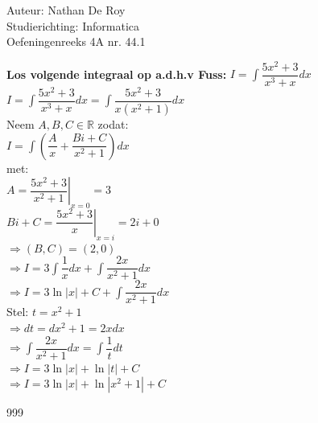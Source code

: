 \documentclass[a4paper]{article}
\begin{document}
\noindent \large Auteur: Nathan De Roy \\
\noindent \large Studierichting: Informatica\\
\noindent \large Oefeningenreeks 4A nr. 44.1\\

\medskip
\normalsize


\textbf{Los volgende integraal op a.d.h.v Fuss:} $I = \displaystyle\int \dfrac{5x^2 + 3}{x^3 + x}dx$\\

$I = \displaystyle\int \dfrac{5x^2 + 3}{x^3 + x}dx = \displaystyle\int \dfrac{5x^2 + 3}{x (x^2 + 1)}dx$\\

Neem $A, B, C \in \mathbb{R}$ zodat:\\

$I = \displaystyle\int \left( \dfrac{A}{x} + \dfrac{Bi + C}{x^2 + 1} \right) dx$\\

met:\\

$\left. A = \dfrac{5x^2 + 3}{x^2 + 1} \right|_{x=0} = 3$\\

$\left. Bi + C = \dfrac{5x^2 + 3}{x} \right|_{x = i} = 2i + 0$\\

$\Rightarrow (B, C) = (2, 0)$\\

$\Rightarrow I = 3 \displaystyle\int \dfrac{1}{x}dx + \displaystyle\int \dfrac{2x}{x^2 + 1}dx$\\

$\Rightarrow I = 3 \ln|x| + C + \displaystyle\int \dfrac{2x}{x^2 + 1}dx$\\

Stel: $t = x^2 + 1$\\

$\Rightarrow dt = dx^2 + 1 = 2xdx$\\

$\Rightarrow \displaystyle\int \dfrac{2x}{x^2 + 1}dx = \displaystyle\int \dfrac{1}{t}dt$\\

$\Rightarrow I = 3 \ln|x| + \ln|t| + C$\\

$\Rightarrow I = 3 \ln|x| + \ln|x^2 + 1| + C$\\


\begin{thebibliography}{999}
\end{thebibliography}
\end{document}
